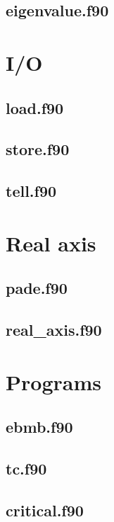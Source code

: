 

\subsection{eigenvalue.f90}



\section{I/O}

\subsection{load.f90}



\subsection{store.f90}



\subsection{tell.f90}



\section{Real axis}

\subsection{pade.f90}



\subsection{real\_axis.f90}



\section{Programs}

\subsection{ebmb.f90}



\subsection{tc.f90}



\subsection{critical.f90}


